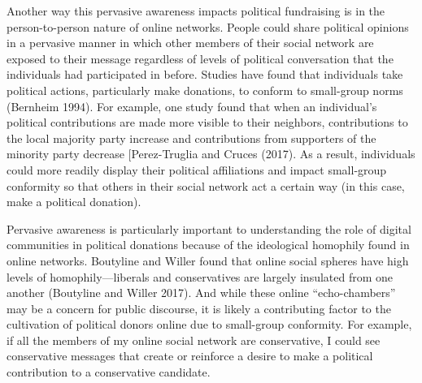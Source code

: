 \documentclass[12pt,]{article}
\begin{document}
Another way this pervasive awareness impacts political fundraising is in
the person-to-person nature of online networks. People could share
political opinions in a pervasive manner in which other members of their
social network are exposed to their message regardless of levels of
political conversation that the individuals had participated in before.
Studies have found that individuals take political actions, particularly
make donations, to conform to small-group norms (Bernheim 1994). For
example, one study found that when an individual's political
contributions are made more visible to their neighbors, contributions to
the local majority party increase and contributions from supporters of
the minority party decrease {[}Perez-Truglia and Cruces (2017). As a
result, individuals could more readily display their political
affiliations and impact small-group conformity so that others in their
social network act a certain way (in this case, make a political
donation).

Pervasive awareness is particularly important to understanding the role
of digital communities in political donations because of the ideological
homophily found in online networks. Boutyline and Willer found that
online social spheres have high levels of homophily---liberals and
conservatives are largely insulated from one another (Boutyline and
Willer 2017). And while these online ``echo-chambers'' may be a concern
for public discourse, it is likely a contributing factor to the
cultivation of political donors online due to small-group conformity.
For example, if all the members of my online social network are
conservative, I could see conservative messages that create or reinforce
a desire to make a political contribution to a conservative candidate.
\end{document}
